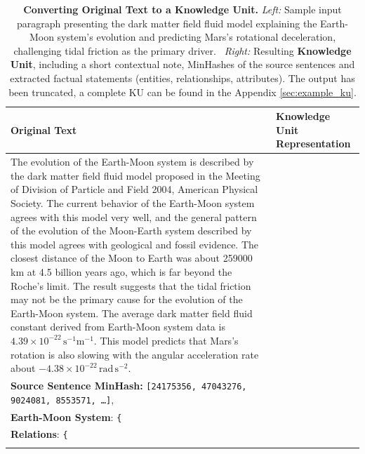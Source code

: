 \begin{table}[ht]
\centering
\small
\vspace{-0.3cm}
\caption{\textbf{Converting Original Text to a Knowledge Unit.} \emph{Left:} Sample input paragraph presenting the dark matter field fluid model explaining the Earth-Moon system's evolution and predicting Mars's rotational deceleration, challenging tidal friction as the primary driver.~\cite{pan2007evolution} 
\emph{Right:} Resulting \textbf{Knowledge Unit}, including a short contextual note, MinHashes of the source sentences and extracted factual statements (entities, relationships, attributes). The output has been truncated, a complete KU can be found in the Appendix \ref{sec:example_ku}.}\vspace{0.1cm}
\setlength{\tabcolsep}{8pt} %
\renewcommand{\arraystretch}{1.3} %
\begin{tabularx}{\textwidth}{X|X}
\hline
\textbf{Original Text} & \textbf{Knowledge Unit Representation} \\
\hline
The evolution of the Earth-Moon system is described by the dark matter field fluid model proposed in the Meeting of Division of Particle and Field 2004, American Physical Society. The current behavior of the Earth-Moon system agrees with this model very well, and the general pattern of the evolution of the Moon-Earth system described by this model agrees with geological and fossil evidence. The closest distance of the Moon to Earth was about 259000 km at 4.5 billion years ago, which is far beyond the Roche's limit. The result suggests that the tidal friction may not be the primary cause for the evolution of the Earth-Moon system. The average dark matter field fluid constant derived from Earth-Moon system data is $4.39 \times 10^{-22} \, \text{s}^{-1}\text{m}^{-1}$. This model predicts that Mars's rotation is also slowing with the angular acceleration rate about $-4.38 \times 10^{-22} \, \text{rad} \, \text{s}^{-2}$. 
& 
\begin{minipage}[t]{\linewidth}
\tiny
\textbf{Context:} \texttt{"The text appears in a scientific discussion on how the Earth-Moon system's evolution can be explained by a dark matter field fluid model\ldots"}\\
\textbf{Source Sentence MinHash:} \texttt{[24175356, 47043276, 9024081, 8553571, \ldots]},\\
\textbf{Earth-Moon System}: \texttt{\{} \\
    \hspace*{0.5em} \textbf{Relations}: \texttt{\{} \\

\end{minipage}
\end{tabularx}
\end{table}
